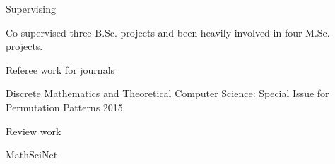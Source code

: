 


\begin{cventries}


\cventry
{Supervising}
{}
{}
{}
{
\begin{cvitems} %
  \item {Co-supervised three B.Sc. projects and been heavily involved in four M.Sc. projects.}
\end{cvitems}
}



\cventry
{Referee work for journals}
{}
{}
{}
{
\begin{cvitems} %
  \item {Discrete Mathematics and Theoretical Computer Science: Special Issue for Permutation Patterns 2015}
\end{cvitems}
}


\cventry
{Review work}
{}
{}
{}
{
\begin{cvitems} %
  \item {MathSciNet}
\end{cvitems}
}


\end{cventries}
